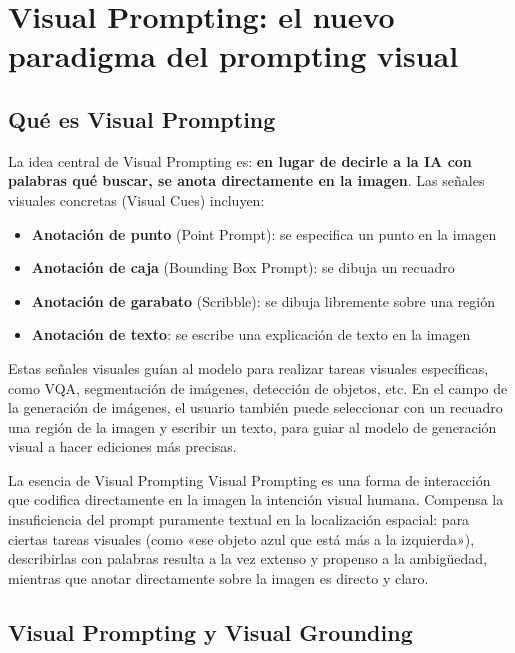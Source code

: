 \section{Visual Prompting: el nuevo paradigma del prompting visual}

\subsection{Qué es Visual Prompting}

La idea central de Visual Prompting es: \textbf{en lugar de decirle a la IA con palabras qué buscar, se anota directamente en la imagen}. Las señales visuales concretas (Visual Cues) incluyen:

\begin{itemize}
    \item \textbf{Anotación de punto} (Point Prompt): se especifica un punto en la imagen
    \item \textbf{Anotación de caja} (Bounding Box Prompt): se dibuja un recuadro
    \item \textbf{Anotación de garabato} (Scribble): se dibuja libremente sobre una región
    \item \textbf{Anotación de texto}: se escribe una explicación de texto en la imagen
\end{itemize}

Estas señales visuales guían al modelo para realizar tareas visuales específicas, como VQA, segmentación de imágenes, detección de objetos, etc. En el campo de la generación de imágenes, el usuario también puede seleccionar con un recuadro una región de la imagen y escribir un texto, para guiar al modelo de generación visual a hacer ediciones más precisas.

\begin{importantbox}{La esencia de Visual Prompting}
Visual Prompting es una forma de interacción que codifica directamente en la imagen la intención visual humana. Compensa la insuficiencia del prompt puramente textual en la localización espacial: para ciertas tareas visuales (como «ese objeto azul que está más a la izquierda»), describirlas con palabras resulta a la vez extenso y propenso a la ambigüedad, mientras que anotar directamente sobre la imagen es directo y claro.
\end{importantbox}

\subsection{Visual Prompting y Visual Grounding}


